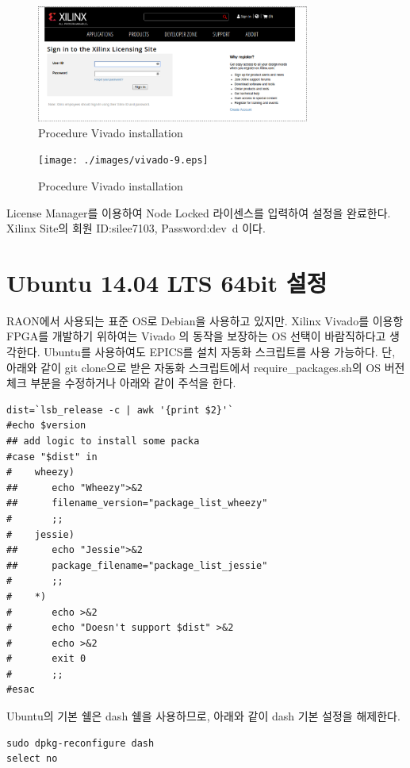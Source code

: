 \documentclass[11pt
  , a4paper
  , article
  , oneside
]{memoir}
\begin{document}
\begin{figure}[h!]
	\centering
	\includegraphics[width=0.8\textwidth, height=0.4\textwidth]{./images/vivado-8.eps}
	\caption{Procedure Vivado installation}
	\label{fig:viva_install_8} 
\end{figure}

\begin{figure}[h!]
	\centering
	\texttt{[image: ./images/vivado-9.eps]}
	\caption{Procedure Vivado installation}
	\label{fig:viva_install_9} 
\end{figure}

\clearpage

License Manager를 이용하여 Node Locked 라이센스를 입력하여 설정을 완료한다. Xilinx Site의 회원 ID:silee7103, Password:dev~d 이다.

\chapter{Ubuntu 14.04 LTS 64bit 설정}
RAON에서 사용되는 표준 OS로 Debian을 사용하고 있지만. Xilinx Vivado를 이용항 FPGA를 개발하기 위하여는 Vivado 의 동작을 보장하는 OS 선택이 바람직하다고 생각한다. Ubuntu를 사용하여도 EPICS를 설치 자동화 스크립트를 사용 가능하다.
단, 아래와 같이 git clone으로 받은 자동화 스크립트에서 require\_packages.sh의 OS 버전체크 부분을 수정하거나 아래와 같이 주석을 한다.


\begin{lstlisting}[style=termstyle]
dist=`lsb_release -c | awk '{print $2}'`
#echo $version
## add logic to install some packa
#case "$dist" in
#    wheezy)
##      echo "Wheezy">&2
##      filename_version="package_list_wheezy"
#       ;;
#    jessie)
##      echo "Jessie">&2
##      package_filename="package_list_jessie"
#       ;;
#    *)
#       echo >&2
#       echo "Doesn't support $dist" >&2
#       echo >&2
#       exit 0
#       ;;
#esac
\end{lstlisting}

Ubuntu의 기본 쉘은 dash 쉘을 사용하므로, 아래와 같이 dash 기본 설정을 해제한다.
\begin{lstlisting}[style=termstyle]
sudo dpkg-reconfigure dash
select no
\end{lstlisting}
\end{document}
